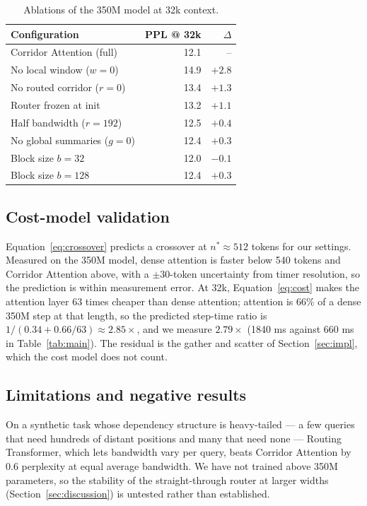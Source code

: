 \documentclass[11pt]{article}
\begin{document}
\begin{table}[t]
  \centering
  \begin{tabular}{lrr}
    \toprule
    Configuration & PPL @ 32k & $\Delta$ \\
    \midrule
    Corridor Attention (full)     & 12.1 & --     \\
    No local window ($w = 0$)     & 14.9 & $+2.8$ \\
    No routed corridor ($r = 0$)  & 13.4 & $+1.3$ \\
    Router frozen at init         & 13.2 & $+1.1$ \\
    Half bandwidth ($r = 192$)    & 12.5 & $+0.4$ \\
    No global summaries ($g = 0$) & 12.4 & $+0.3$ \\
    Block size $b = 32$           & 12.0 & $-0.1$ \\
    Block size $b = 128$          & 12.4 & $+0.3$ \\
    \bottomrule
  \end{tabular}
  \caption{Ablations of the 350M model at 32k context.}
  \label{tab:ablation}
\end{table}

\subsection{Cost-model validation}\label{sec:validation}

Equation~\eqref{eq:crossover} predicts a crossover at $n^{*} \approx 512$
tokens for our settings. Measured on the 350M model, dense attention is
faster below 540 tokens and Corridor Attention above, with a $\pm 30$-token
uncertainty from timer resolution, so the prediction is within measurement
error. At 32k, Equation~\eqref{eq:cost} makes the attention layer 63 times
cheaper than dense attention; attention is 66\% of a dense 350M step at that
length, so the predicted step-time ratio is $1/(0.34 + 0.66/63) \approx
2.85\times$, and we measure $2.79\times$ (1840 ms against 660 ms in
Table~\ref{tab:main}). The residual is the gather and scatter of
Section~\ref{sec:impl}, which the cost model does not count.

\subsection{Limitations and negative results}\label{sec:limits}

On a synthetic task whose dependency structure is heavy-tailed --- a few
queries that need hundreds of distant positions and many that need none ---
Routing Transformer, which lets bandwidth vary per query, beats Corridor
Attention by 0.6 perplexity at equal average bandwidth. We have not trained
above 350M parameters, so the stability of the straight-through router at
larger widths (Section~\ref{sec:discussion}) is untested rather than
established.
\end{document}

